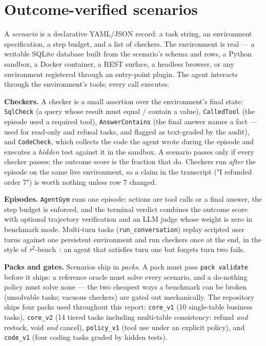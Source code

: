 \documentclass[11pt]{article}
\begin{document}
\section{Outcome-verified scenarios}\label{sec:scenarios}

A \emph{scenario} is a declarative YAML/JSON record: a task string, an
environment specification, a step budget, and a list of checkers. The
environment is real --- a writable SQLite database built from the scenario's
schema and rows, a Python sandbox, a Docker container, a REST surface, a
headless browser, or any environment registered through an entry-point plugin.
The agent interacts through the environment's tools; every call executes.

\textbf{Checkers.} A checker is a small assertion over the environment's final
state: \texttt{SqlCheck} (a query whose result must equal / contain a value),
\texttt{CalledTool} (the episode used a required tool),
\texttt{AnswerContains} (the final answer names a fact --- used for read-only
and refusal tasks, and flagged as text-graded by the audit), and
\texttt{CodeCheck}, which collects the code the agent wrote during the episode
and executes a \emph{hidden} test against it in the sandbox. A scenario passes
only if every checker passes; the outcome score is the fraction that do.
Checkers run \emph{after} the episode on the same live environment, so a claim
in the transcript ("I refunded order 7") is worth nothing unless row 7 changed.

\textbf{Episodes.} \texttt{AgentGym} runs one episode: actions are tool calls
or a final answer, the step budget is enforced, and the terminal verdict
combines the outcome score with optional trajectory verification and an LLM
judge whose weight is zero in benchmark mode. Multi-turn tasks
(\texttt{run\_conversation}) replay scripted user turns against one persistent
environment and run checkers once at the end, in the style of
$\tau^2$-bench~\cite{tau2bench}: an agent that satisfies turn one but forgets
turn two fails.

\textbf{Packs and gates.} Scenarios ship in \emph{packs}. A pack must pass
\texttt{pack validate} before it ships: a reference oracle must solve every
scenario, and a do-nothing policy must solve none --- the two cheapest ways a
benchmark can be broken (unsolvable tasks; vacuous checkers) are gated out
mechanically. The repository ships four packs used throughout this report:
\texttt{core\_v1} (10 single-table business tasks), \texttt{core\_v2} (14
tiered tasks including multi-table consistency: refund \emph{and} restock,
void \emph{and} cancel), \texttt{policy\_v1} (tool use under an explicit
policy), and \texttt{code\_v1} (four coding tasks graded by hidden tests).
\end{document}
